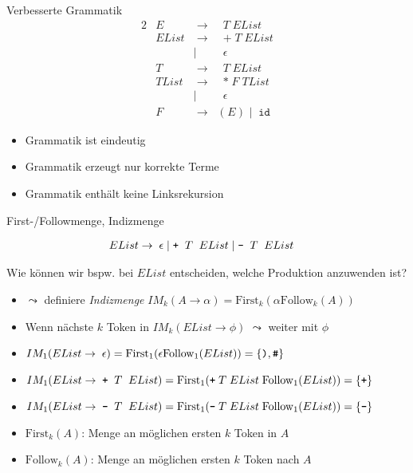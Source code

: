 \documentclass{beamer}
\begin{document}
\begin{frame}{Verbesserte Grammatik}
  \begin{alignat*}{2}
    & E      & \; \to \; & \; T \; EList \\
    & EList  & \; \to \; & \; \texttt{+} \; T \; EList \\
            && \mid \;\; & \; \epsilon \\
    & T      & \; \to \; & \; T \; EList \\
    & TList  & \; \to \; & \; \texttt{*} \; F \; TList \\
            && \mid \;\; & \; \epsilon \\
    & F      & \; \to \; & \texttt{(} \; E \; \texttt{)} \; \mid \; \texttt{id}
  \end{alignat*}

  \begin{itemize}
    \item Grammatik ist eindeutig \true
    \item Grammatik erzeugt nur korrekte Terme \true
    \item Grammatik enthält keine Linksrekursion \true
  \end{itemize}
\end{frame}

\begin{frame}{First-/Followmenge, Indizmenge}
	\footnotesize

	\begin{align*}
		EList \to & \;\; \epsilon \mid \textrm{\texttt{+}} \;\; T \;\; EList \mid \textrm{\texttt{-}} \;\; T \;\; EList
	\end{align*}
	
	Wie können wir bspw. bei $EList$ entscheiden, welche Produktion anzuwenden ist?
	\pause
	\begin{itemize}
		\item $\leadsto$ definiere \emph{Indizmenge} $IM_k(A \to \alpha) = \textrm{First}_k(\alpha \textrm{Follow}_k(A))$
		\item Wenn nächste $k$ Token in $IM_k(EList \to \phi)$ $\leadsto$ weiter mit $\phi$
		\pause
		\item $IM_1(EList \to \; \epsilon) = \textrm{First}_1(\epsilon \textrm{Follow}_1(EList)) = \{ \textrm{\texttt{)}}, \textrm{\texttt{\#}} \}$
		\item $IM_1(EList \to \; \textrm{\texttt{+}} \;\; T \;\; EList) = \textrm{First}_1(\textrm{\texttt{+}} \; T \; EList \; \textrm{Follow}_1(EList)) = \{ \textrm{\texttt{+}} \}$
		\item $IM_1(EList \to \; \textrm{\texttt{-}} \;\; T \;\; EList) = \textrm{First}_1(\textrm{\texttt{-}} \; T \; EList \; \textrm{Follow}_1(EList)) = \{ \textrm{\texttt{-}} \}$
		\pause
		\item $\textrm{First}_k(A)$: Menge an möglichen ersten $k$ Token in $A$
		\item $\textrm{Follow}_k(A)$: Menge an möglichen ersten $k$ Token nach $A$
	\end{itemize}
\end{frame}
\end{document}
